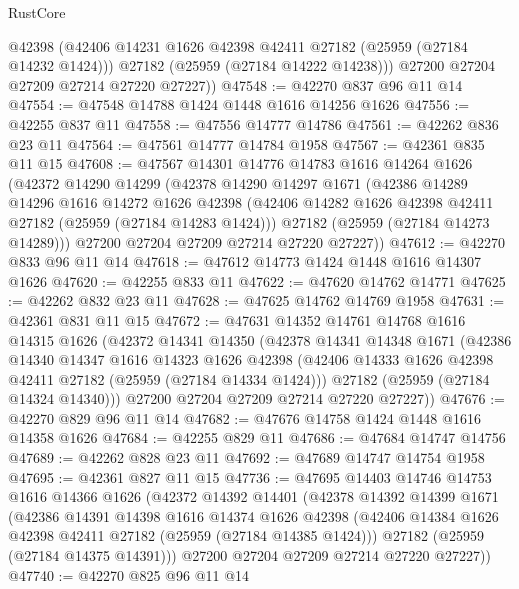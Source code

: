 \begin{lexlean}{RustCore}
\begin{coremodule}
          @42398
          (@42406 @14231 @1626 @42398 @42411 @27182 (@25959 (@27184 @14232 @1424)))
          @27182
          (@25959 (@27184 @14222 @14238)))
        @27200
        @27204
        @27209
        @27214
        @27220
        @27227))
@47548 := @42270 @837 @96 @11 @14
@47554 := @47548 @14788 @1424 @1448 @1616 @14256 @1626
@47556 := @42255 @837 @11
@47558 := @47556 @14777 @14786
@47561 := @42262 @836 @23 @11
@47564 := @47561 @14777 @14784 @1958
@47567 := @42361 @835 @11 @15
@47608 := @47567
    @14301
    @14776
    @14783
    @1616
    @14264
    @1626
    (@42372
      @14290
      @14299
      (@42378
        @14290
        @14297
        @1671
        (@42386
          @14289
          @14296
          @1616
          @14272
          @1626
          @42398
          (@42406 @14282 @1626 @42398 @42411 @27182 (@25959 (@27184 @14283 @1424)))
          @27182
          (@25959 (@27184 @14273 @14289)))
        @27200
        @27204
        @27209
        @27214
        @27220
        @27227))
@47612 := @42270 @833 @96 @11 @14
@47618 := @47612 @14773 @1424 @1448 @1616 @14307 @1626
@47620 := @42255 @833 @11
@47622 := @47620 @14762 @14771
@47625 := @42262 @832 @23 @11
@47628 := @47625 @14762 @14769 @1958
@47631 := @42361 @831 @11 @15
@47672 := @47631
    @14352
    @14761
    @14768
    @1616
    @14315
    @1626
    (@42372
      @14341
      @14350
      (@42378
        @14341
        @14348
        @1671
        (@42386
          @14340
          @14347
          @1616
          @14323
          @1626
          @42398
          (@42406 @14333 @1626 @42398 @42411 @27182 (@25959 (@27184 @14334 @1424)))
          @27182
          (@25959 (@27184 @14324 @14340)))
        @27200
        @27204
        @27209
        @27214
        @27220
        @27227))
@47676 := @42270 @829 @96 @11 @14
@47682 := @47676 @14758 @1424 @1448 @1616 @14358 @1626
@47684 := @42255 @829 @11
@47686 := @47684 @14747 @14756
@47689 := @42262 @828 @23 @11
@47692 := @47689 @14747 @14754 @1958
@47695 := @42361 @827 @11 @15
@47736 := @47695
    @14403
    @14746
    @14753
    @1616
    @14366
    @1626
    (@42372
      @14392
      @14401
      (@42378
        @14392
        @14399
        @1671
        (@42386
          @14391
          @14398
          @1616
          @14374
          @1626
          @42398
          (@42406 @14384 @1626 @42398 @42411 @27182 (@25959 (@27184 @14385 @1424)))
          @27182
          (@25959 (@27184 @14375 @14391)))
        @27200
        @27204
        @27209
        @27214
        @27220
        @27227))
@47740 := @42270 @825 @96 @11 @14

\end{coremodule}
\end{lexlean}
